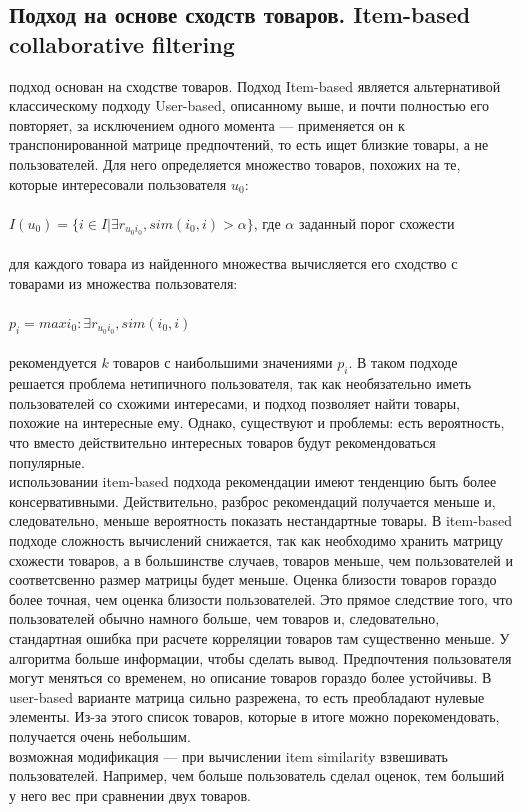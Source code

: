 \documentclass{article}
\newcommand\tab[1][1cm]{\hspace*{#1}}
\begin{document}
\subsection{Подход на основе сходств товаров. Item-based collaborative filtering}
 подход основан на сходстве товаров. Подход Item-based является альтернативой классическому подходу User-based, описанному выше, и почти полностью его повторяет, за исключением одного момента — применяется он к транспонированной матрице предпочтений, то есть ищет близкие товары, а не пользователей. Для него определяется множество товаров, похожих на те, которые интересовали пользователя ﻿$u_0$:\\
\\
\tab$I(u_0)=\{i\in I|\exists r_{u_0i_0}, sim(i_0,i)>\alpha \}$, где ﻿$\alpha$ заданный порог схожести\\
\\
 для каждого товара из найденного множества вычисляется его сходство с товарами из множества пользователя:\\
\\
\tab$p_i=max i_0: \exists r_{u_0i_0},sim(i_0,i)$\\
\\
 рекомендуется ﻿$k$ товаров с наибольшими значениями $p_i$﻿. В таком подходе решается проблема нетипичного пользователя, так как необязательно иметь пользователей со схожими интересами, и подход позволяет найти товары, похожие на интересные ему. Однако, существуют и проблемы: есть вероятность, что вместо действительно интересных товаров будут рекомендоваться популярные.\\
 использовании item-based подхода рекомендации имеют тенденцию быть более консервативными. Действительно, разброс рекомендаций получается меньше и, следовательно, меньше вероятность показать нестандартные товары. В item-based подходе сложность вычислений снижается, так как необходимо хранить матрицу схожести товаров, а в большинстве случаев, товаров меньше, чем пользователей и соответсвенно размер матрицы будет меньше. Оценка близости товаров гораздо более точная, чем оценка близости пользователей. Это прямое следствие того, что пользователей обычно намного больше, чем товаров и, следовательно, стандартная ошибка при расчете корреляции товаров там существенно меньше. У алгоритма больше информации, чтобы сделать вывод. Предпочтения пользователя могут меняться со временем, но описание товаров гораздо более устойчивы. В user-based варианте матрица сильно разрежена, то есть преобладают нулевые элементы. Из-за этого список товаров, которые в итоге можно порекомендовать, получается очень небольшим.\\
 возможная модификация — при вычислении item similarity взвешивать пользователей. Например, чем больше пользователь сделал оценок, тем больший у него вес при сравнении двух товаров.
\end{document}
